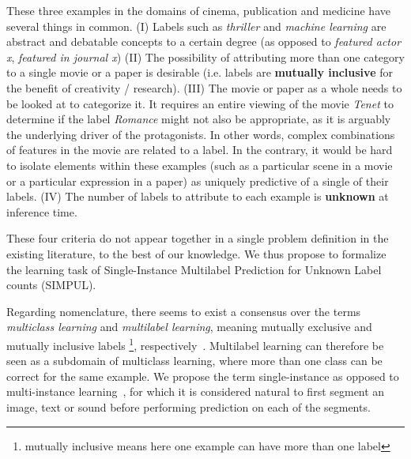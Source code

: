 These three examples in the domains of cinema, publication and medicine have several things in common. (I) Labels such as \textit{thriller} and \textit{machine learning} are abstract and debatable concepts to a certain degree (as opposed to \textit{featured actor x}, \textit{featured in journal x}) (II) The possibility of attributing more than one category to a single movie or a paper is desirable (i.e. labels are \textbf{mutually inclusive} for the benefit of creativity / research). (III) The movie or paper as a whole needs to be looked at to categorize it. It requires an entire viewing of the movie \textit{Tenet} to determine if the label \textit{Romance} might not also be appropriate, as it is arguably the underlying driver of the protagonists. In other words, complex combinations of features in the movie are related to a label. In the contrary, it would be hard to isolate elements within these examples (such as a particular scene in a movie or a particular expression in a paper) as uniquely predictive of a single of their labels. (IV) The number of labels to attribute to each example is \textbf{unknown} at inference time.

These four criteria do not appear together in a single problem definition in the existing literature, to the best of our knowledge. We thus propose to formalize the learning task of Single-Instance Multilabel Prediction for Unknown Label counts (SIMPUL). 

Regarding nomenclature, there seems to exist a consensus over the terms \emph{multiclass learning} and \emph{multilabel learning}, meaning mutually exclusive and mutually inclusive labels \footnote{mutually inclusive means here one example can have more than one label}, respectively~\cite{multilabelMethods}. Multilabel learning can therefore be seen as a subdomain of multiclass learning, where more than one class can be correct for the same example. We propose the term single-instance as opposed to multi-instance learning~\citep[e.g.,][]{multiInstance, multiInstanceMultiLabel}, for which it is considered natural to first segment an image, text or sound before performing prediction on each of the segments.

